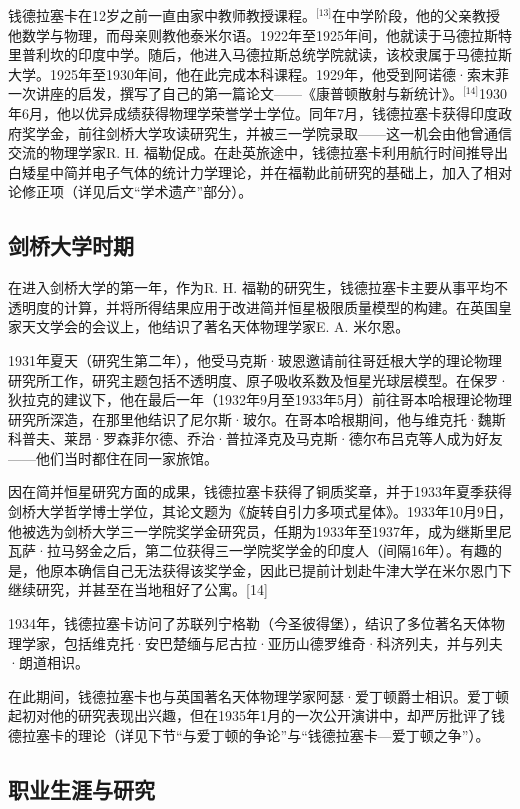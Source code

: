 钱德拉塞卡在12岁之前一直由家中教师教授课程。\(^\text{[13]}\)在中学阶段，他的父亲教授他数学与物理，而母亲则教他泰米尔语。1922年至1925年间，他就读于马德拉斯特里普利坎的印度中学。随后，他进入马德拉斯总统学院就读，该校隶属于马德拉斯大学。1925年至1930年间，他在此完成本科课程。1929年，他受到阿诺德·索末菲一次讲座的启发，撰写了自己的第一篇论文——《康普顿散射与新统计》。\(^\text{[14]}\)1930年6月，他以优异成绩获得物理学荣誉学士学位。同年7月，钱德拉塞卡获得印度政府奖学金，前往剑桥大学攻读研究生，并被三一学院录取——这一机会由他曾通信交流的物理学家R. H. 福勒促成。在赴英旅途中，钱德拉塞卡利用航行时间推导出白矮星中简并电子气体的统计力学理论，并在福勒此前研究的基础上，加入了相对论修正项（详见后文“学术遗产”部分）。
\subsection{剑桥大学时期}
在进入剑桥大学的第一年，作为R. H. 福勒的研究生，钱德拉塞卡主要从事平均不透明度的计算，并将所得结果应用于改进简并恒星极限质量模型的构建。在英国皇家天文学会的会议上，他结识了著名天体物理学家E. A. 米尔恩。

1931年夏天（研究生第二年），他受马克斯·玻恩邀请前往哥廷根大学的理论物理研究所工作，研究主题包括不透明度、原子吸收系数及恒星光球层模型。在保罗·狄拉克的建议下，他在最后一年（1932年9月至1933年5月）前往哥本哈根理论物理研究所深造，在那里他结识了尼尔斯·玻尔。在哥本哈根期间，他与维克托·魏斯科普夫、莱昂·罗森菲尔德、乔治·普拉泽克及马克斯·德尔布吕克等人成为好友——他们当时都住在同一家旅馆。

因在简并恒星研究方面的成果，钱德拉塞卡获得了铜质奖章，并于1933年夏季获得剑桥大学哲学博士学位，其论文题为《旋转自引力多项式星体》。1933年10月9日，他被选为剑桥大学三一学院奖学金研究员，任期为1933年至1937年，成为继斯里尼瓦萨·拉马努金之后，第二位获得三一学院奖学金的印度人（间隔16年）。有趣的是，他原本确信自己无法获得该奖学金，因此已提前计划赴牛津大学在米尔恩门下继续研究，并甚至在当地租好了公寓。[14]

1934年，钱德拉塞卡访问了苏联列宁格勒（今圣彼得堡），结识了多位著名天体物理学家，包括维克托·安巴楚缅与尼古拉·亚历山德罗维奇·科济列夫，并与列夫·朗道相识。

在此期间，钱德拉塞卡也与英国著名天体物理学家阿瑟·爱丁顿爵士相识。爱丁顿起初对他的研究表现出兴趣，但在1935年1月的一次公开演讲中，却严厉批评了钱德拉塞卡的理论（详见下节“与爱丁顿的争论”与“钱德拉塞卡—爱丁顿之争”）。
\subsection{职业生涯与研究}
